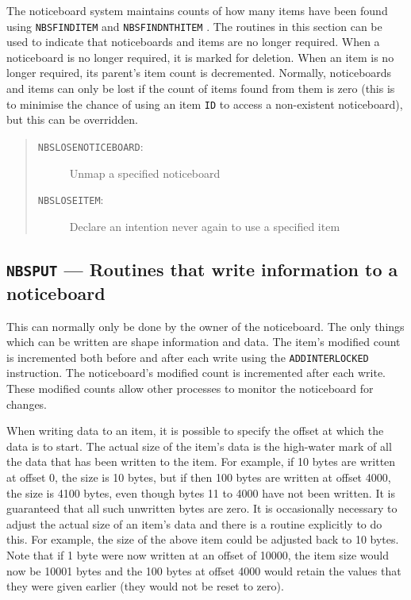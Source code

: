 \documentclass[twoside,11pt]{article}
\renewcommand{\_}{\texttt{\symbol{95}}}
\newcommand{\mansection}[2]{\subsection{#1 --- #2}}
\newenvironment{mansectionroutines}{\begin{quote}\begin{description}}%
{\end{description}\end{quote}}
\newcommand{\mansectionitem}[1]{\item[#1:]\mbox{}}
\newcommand{\mantt}{\tt}
\begin{document}
      The noticeboard system maintains counts of how many items have been
      found using {\mantt{NBS\_FIND\_ITEM}} and {\mantt{NBS\_FIND\_NTH\_ITEM}}%
. The routines in this
      section can be used to indicate that noticeboards and items are no
      longer required. When a noticeboard is no longer required, it is marked
      for deletion. When an item is no longer required, its parent's item
      count is decremented. Normally, noticeboards and items can only be lost
      if the count of items found from them is zero (this is to minimise the
      chance of using an item {\mantt{ID}} to access a non-existent %
noticeboard), but
      this can be overridden.

\begin{mansectionroutines}
\mansectionitem {{\mantt{NBS\_LOSE\_NOTICEBOARD}}}
      Unmap a specified noticeboard
\mansectionitem {{\mantt{NBS\_LOSE\_ITEM}}}
      Declare an intention never again to use a specified item
\end{mansectionroutines}
\mansection {{\mantt{NBS\_PUT}}}{      Routines that write information to a %
noticeboard}

      This can normally only be done by the owner of the noticeboard. The only
      things which can be written are shape information and data. The item's
      modified count is incremented both before and after each write using the
      {\mantt{ADD\_INTERLOCKED}} instruction. The noticeboard's modified %
count is
      incremented after each write. These modified counts allow other processes
      to monitor the noticeboard for changes.

      When writing data to an item, it is possible to specify the offset
      at which the data is to start. The actual size of the item's data
      is the high-water mark of all the data that has been written to the
      item. For example, if 10 bytes are written at offset 0, the size is
      10 bytes, but if then 100 bytes are written at offset 4000, the size
      is 4100 bytes, even though bytes 11 to 4000 have not been written.
      It is guaranteed that all such unwritten bytes are zero. It is
      occasionally necessary to adjust the actual size of an item's data
      and there is a routine explicitly to do this. For example, the size
      of the above item could be adjusted back to 10 bytes. Note that if
      1 byte were now written at an offset of 10000, the item size would
      now be 10001 bytes and the 100 bytes at offset 4000 would retain the
      values that they were given earlier (they would not be reset to zero).
\end{document}
